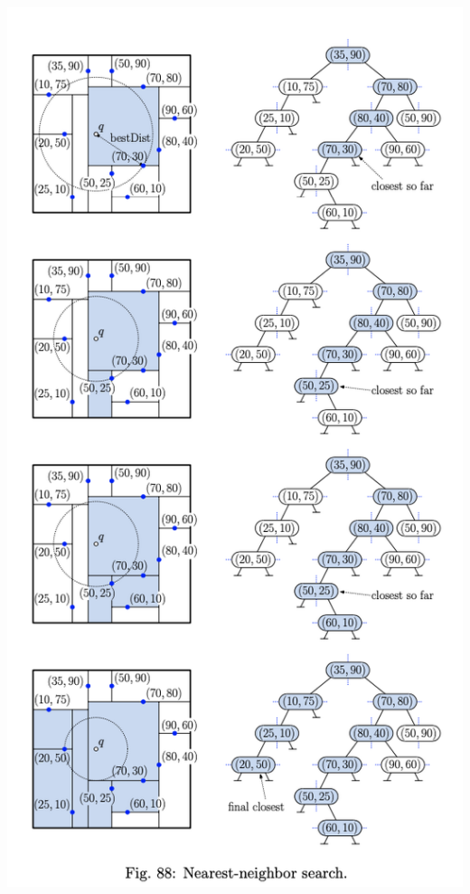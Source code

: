 \documentclass{article}
\begin{document}
  \begin{center}
  \includegraphics{NearestNeighborQuery}
  \end{center}
  \newpage
\end{document}
